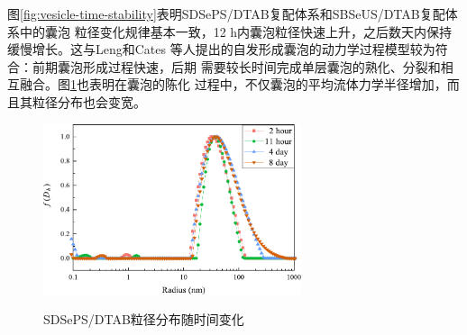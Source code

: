 \documentclass[bachelor,fandolfonts,replaceperiod]{jnuthesis}
\begin{document}
    图\ref{fig:vesicle-time-stability}表明SDSePS/DTAB复配体系和SBSeUS/DTAB复配体系中的囊泡
    粒径变化规律基本一致，12 h内囊泡粒径快速上升，之后数天内保持缓慢增长。这与Leng和Cates
    等人提出的自发形成囊泡的动力学过程模型\cite{刘洪国2016}较为符合：前期囊泡形成过程快速，后期
    需要较长时间完成单层囊泡的熟化、分裂和相互融合。图\ref{fig:vesicle-radius}也表明在囊泡的陈化
    过程中，不仅囊泡的平均流体力学半径增加，而且其粒径分布也会变宽。
    \begin{figure}[htbp]
        \centering
        \includegraphics[width=0.675\textwidth]{figure/vesicle-radius.pdf}\\
        \caption{SDSePS/DTAB粒径分布随时间变化}\label{fig:vesicle-radius}
    \end{figure}
\end{document}
